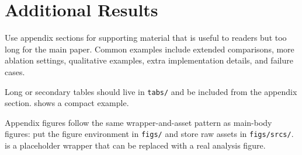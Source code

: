 \section{Additional Results}
\label{sec:app_additional_results}

Use appendix sections for supporting material that is useful to readers but too
long for the main paper. Common examples include extended comparisons, more
ablation settings, qualitative examples, extra implementation details, and
failure cases.

Long or secondary tables should live in \texttt{tabs/} and be included from the
appendix section.  shows a compact example.

Appendix figures follow the same wrapper-and-asset pattern as main-body figures:
put the figure environment in \texttt{figs/} and store raw assets in
\texttt{figs/srcs/}.  is a placeholder wrapper that
can be replaced with a real analysis figure.



